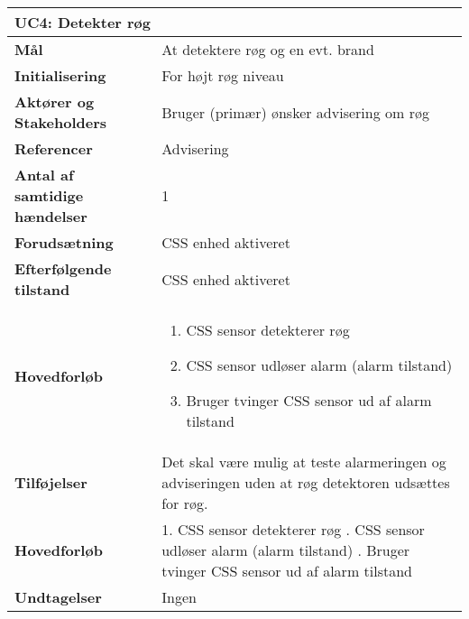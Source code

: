 \begin{table}[H] \centering
\begin{tabular}{|p{6cm}|p{8cm}|}
	\hline
\multicolumn{2}{|l|}{\textbf{UC4: Detekter røg}} \\\hline
\textbf{Mål}								&At detektere røg og en evt. brand \\\hline
\textbf{Initialisering}					&For højt røg niveau\\\hline
\textbf{Aktører og Stakeholders}			&Bruger (primær) ønsker advisering om røg \\\hline
\textbf{Referencer}						&Advisering \\\hline
\textbf{Antal af samtidige hændelser}	&1 \\\hline
\textbf{Forudsætning}					&CSS enhed aktiveret  \\\hline
\textbf{Efterfølgende tilstand}			&CSS enhed aktiveret \\\hline
\textbf{Hovedforløb}						&\begin{enumerate}
\item CSS sensor detekterer røg 

\item CSS sensor udløser alarm (alarm tilstand)

\item Bruger tvinger CSS sensor ud af alarm tilstand

\end{enumerate}\\\hline

\textbf{Tilføjelser}						&Det skal være mulig at teste alarmeringen og adviseringen uden at røg detektoren udsættes for røg.\\\hline
\textbf{Hovedforløb}						&   
1. CSS sensor detekterer røg \newline 
2. CSS sensor udløser alarm (alarm tilstand) \newline 
3. Bruger tvinger CSS sensor ud af alarm tilstand\\\hline
\textbf{Undtagelser}						&Ingen \\\hline
	\end{tabular}
	\label{UC4} 
\end{table}